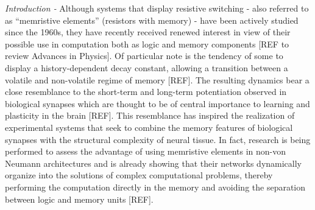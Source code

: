 \documentclass[aps,prl,reprint,groupedaddress]{revtex4-1}
\begin{document}
\pacs{}

\maketitle



{\it Introduction -} Although systems that display resistive switching - also referred to as ``memristive elements'' (resistors with memory) - have been actively studied 
since the 1960s, they have recently received renewed interest in view of their possible use in computation both as logic and memory components [REF to review Advances in Physics].
Of particular note is the tendency of some to display a history-dependent decay constant, allowing a transition
between a volatile and non-volatile regime of memory [REF].  The resulting dynamics
bear a close resemblance to the short-term and long-term potentiation observed in
biological synapses which are thought to be of central importance to learning and
plasticity in the brain [REF].  This resemblance has inspired the realization of experimental
systems that seek to combine the memory features of biological synapses with
the structural complexity of neural tissue. In fact, research is being
performed to assess the advantage of using memristive elements in non-von
Neumann architectures and is already showing that their networks 
dynamically organize into the solutions of complex computational problems, thereby
performing the computation directly in the memory and avoiding the separation
between logic and memory units [REF].  
\end{document}

